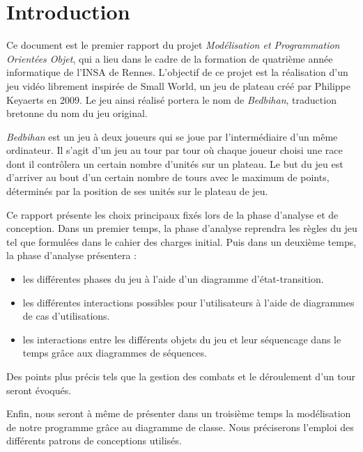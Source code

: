 \section{Introduction}
	
	Ce document est le premier rapport du projet \emph{Modélisation et Programmation Orientées Objet}, qui a lieu dans le cadre de la formation de quatrième année informatique de l'INSA de Rennes. L'objectif de ce projet est la réalisation d'un jeu vidéo librement inspirée de Small World, un jeu de plateau créé par Philippe Keyaerts en 2009. Le jeu ainsi réalisé portera le nom de \emph{Bedbihan}, traduction bretonne du nom du jeu original. 

	\emph{Bedbihan} est un jeu à deux joueurs qui se joue par l'intermédiaire d'un même ordinateur. Il s'agit d'un jeu au tour par tour où chaque joueur choisi une race dont il contrôlera un certain nombre d'unités sur un plateau. Le but du jeu est d'arriver au bout d'un certain nombre de tours avec le maximum de points, déterminés par la position de ses unités sur le plateau de jeu. 

	Ce rapport présente les choix principaux fixés lors de la phase d'analyse et de conception. Dans un premier temps, la phase d'analyse reprendra les règles du jeu tel que formulées dans le cahier des charges initial.	Puis dans un deuxième temps, la phase d'analyse présentera :
	\begin{itemize}
		\item les différentes phases du jeu à l'aide d'un diagramme d'état-transition.
		\item les différentes interactions possibles pour l'utilisateurs à l'aide de diagrammes de cas d'utilisations.
		\item les interactions entre les différents objets du jeu et leur séquencage dans le temps grâce aux diagrammes de séquences.  
	\end{itemize}
	Des points plus précis tels que la gestion des combats et le déroulement d'un tour seront évoqués. 

	Enfin, nous seront à même de présenter dans un troisième temps la modélisation de notre programme grâce au diagramme de classe. Nous préciserons l'emploi des différents patrons de conceptions utilisés.






	












